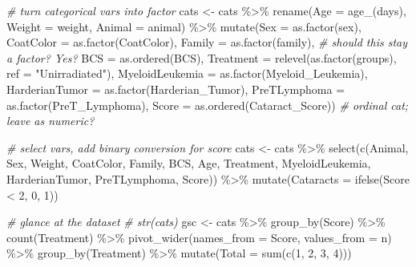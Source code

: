 \documentclass[12pt]{article}
\newenvironment{Shaded}{\begin{snugshade}}{\end{snugshade}}
\newcommand{\AttributeTok}[1]{\textcolor[rgb]{0.77,0.63,0.00}{#1}}
\newcommand{\CommentTok}[1]{\textcolor[rgb]{0.56,0.35,0.01}{\textit{#1}}}
\newcommand{\DecValTok}[1]{\textcolor[rgb]{0.00,0.00,0.81}{#1}}
\newcommand{\FunctionTok}[1]{\textcolor[rgb]{0.00,0.00,0.00}{#1}}
\newcommand{\NormalTok}[1]{#1}
\newcommand{\OtherTok}[1]{\textcolor[rgb]{0.56,0.35,0.01}{#1}}
\newcommand{\SpecialCharTok}[1]{\textcolor[rgb]{0.00,0.00,0.00}{#1}}
\newcommand{\StringTok}[1]{\textcolor[rgb]{0.31,0.60,0.02}{#1}}
\begin{document}
\begin{Shaded}
\begin{Highlighting}[]
\CommentTok{\# turn categorical vars into factor}
\NormalTok{cats }\OtherTok{\textless{}{-}}\NormalTok{ cats }\SpecialCharTok{\%\textgreater{}\%}
  \FunctionTok{rename}\NormalTok{(}\AttributeTok{Age =} \StringTok{\textasciigrave{}}\AttributeTok{age\_(days)}\StringTok{\textasciigrave{}}\NormalTok{,}
         \AttributeTok{Weight =}\NormalTok{ weight,}
         \AttributeTok{Animal =}\NormalTok{ animal) }\SpecialCharTok{\%\textgreater{}\%}
  \FunctionTok{mutate}\NormalTok{(}\AttributeTok{Sex =} \FunctionTok{as.factor}\NormalTok{(sex),}
         \AttributeTok{CoatColor =} \FunctionTok{as.factor}\NormalTok{(CoatColor),}
         \AttributeTok{Family =} \FunctionTok{as.factor}\NormalTok{(family), }\CommentTok{\# should this stay a factor? Yes?}
         \AttributeTok{BCS =} \FunctionTok{as.ordered}\NormalTok{(BCS),}
         \AttributeTok{Treatment =} \FunctionTok{relevel}\NormalTok{(}\FunctionTok{as.factor}\NormalTok{(groups), }\AttributeTok{ref =} \StringTok{"Unirradiated"}\NormalTok{),}
         \AttributeTok{MyeloidLeukemia =} \FunctionTok{as.factor}\NormalTok{(Myeloid\_Leukemia),}
         \AttributeTok{HarderianTumor =} \FunctionTok{as.factor}\NormalTok{(Harderian\_Tumor),}
         \AttributeTok{PreTLymphoma =} \FunctionTok{as.factor}\NormalTok{(PreT\_Lymphoma),}
         \AttributeTok{Score =} \FunctionTok{as.ordered}\NormalTok{(Cataract\_Score)) }\CommentTok{\# ordinal cat; leave as numeric?}

\CommentTok{\# select vars, add binary conversion for score}
\NormalTok{cats }\OtherTok{\textless{}{-}}\NormalTok{ cats }\SpecialCharTok{\%\textgreater{}\%}
  \FunctionTok{select}\NormalTok{(}\FunctionTok{c}\NormalTok{(Animal, Sex, Weight, CoatColor, Family, BCS, Age, Treatment,}
\NormalTok{           MyeloidLeukemia, HarderianTumor, PreTLymphoma, Score)) }\SpecialCharTok{\%\textgreater{}\%}
  \FunctionTok{mutate}\NormalTok{(}\AttributeTok{Cataracts =} \FunctionTok{ifelse}\NormalTok{(Score }\SpecialCharTok{\textless{}} \DecValTok{2}\NormalTok{, }\DecValTok{0}\NormalTok{, }\DecValTok{1}\NormalTok{))}

\CommentTok{\# glance at the dataset}
\CommentTok{\# str(cats)}
\NormalTok{gsc }\OtherTok{\textless{}{-}}\NormalTok{ cats }\SpecialCharTok{\%\textgreater{}\%} \FunctionTok{group\_by}\NormalTok{(Score) }\SpecialCharTok{\%\textgreater{}\%}
  \FunctionTok{count}\NormalTok{(Treatment) }\SpecialCharTok{\%\textgreater{}\%}
  \FunctionTok{pivot\_wider}\NormalTok{(}\AttributeTok{names\_from =}\NormalTok{ Score, }\AttributeTok{values\_from =}\NormalTok{ n) }\SpecialCharTok{\%\textgreater{}\%}
  \FunctionTok{group\_by}\NormalTok{(Treatment) }\SpecialCharTok{\%\textgreater{}\%}
  \FunctionTok{mutate}\NormalTok{(}\AttributeTok{Total =} \FunctionTok{sum}\NormalTok{(}\FunctionTok{c}\NormalTok{(}\StringTok{\textasciigrave{}}\AttributeTok{1}\StringTok{\textasciigrave{}}\NormalTok{, }\StringTok{\textasciigrave{}}\AttributeTok{2}\StringTok{\textasciigrave{}}\NormalTok{, }\StringTok{\textasciigrave{}}\AttributeTok{3}\StringTok{\textasciigrave{}}\NormalTok{, }\StringTok{\textasciigrave{}}\AttributeTok{4}\StringTok{\textasciigrave{}}\NormalTok{)))}


\end{Highlighting}
\end{Shaded}
\end{document}
